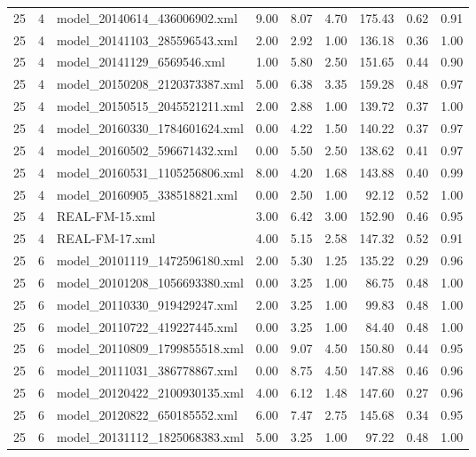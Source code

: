 \begin{table}[ht]
\begin{tabular}{rrlrrrrrr}
   25 &   4 & model\_20140614\_436006902.xml & 9.00 & 8.07 & 4.70 & 175.43 & 0.62 & 0.91 \\ 
   25 &   4 & model\_20141103\_285596543.xml & 2.00 & 2.92 & 1.00 & 136.18 & 0.36 & 1.00 \\ 
   25 &   4 & model\_20141129\_6569546.xml & 1.00 & 5.80 & 2.50 & 151.65 & 0.44 & 0.90 \\ 
   25 &   4 & model\_20150208\_2120373387.xml & 5.00 & 6.38 & 3.35 & 159.28 & 0.48 & 0.97 \\ 
   25 &   4 & model\_20150515\_2045521211.xml & 2.00 & 2.88 & 1.00 & 139.72 & 0.37 & 1.00 \\ 
   25 &   4 & model\_20160330\_1784601624.xml & 0.00 & 4.22 & 1.50 & 140.22 & 0.37 & 0.97 \\ 
   25 &   4 & model\_20160502\_596671432.xml & 0.00 & 5.50 & 2.50 & 138.62 & 0.41 & 0.97 \\ 
   25 &   4 & model\_20160531\_1105256806.xml & 8.00 & 4.20 & 1.68 & 143.88 & 0.40 & 0.99 \\ 
   25 &   4 & model\_20160905\_338518821.xml & 0.00 & 2.50 & 1.00 & 92.12 & 0.52 & 1.00 \\ 
   25 &   4 & REAL-FM-15.xml & 3.00 & 6.42 & 3.00 & 152.90 & 0.46 & 0.95 \\ 
   25 &   4 & REAL-FM-17.xml & 4.00 & 5.15 & 2.58 & 147.32 & 0.52 & 0.91 \\ 
   25 &   6 & model\_20101119\_1472596180.xml & 2.00 & 5.30 & 1.25 & 135.22 & 0.29 & 0.96 \\ 
   25 &   6 & model\_20101208\_1056693380.xml & 0.00 & 3.25 & 1.00 & 86.75 & 0.48 & 1.00 \\ 
   25 &   6 & model\_20110330\_919429247.xml & 2.00 & 3.25 & 1.00 & 99.83 & 0.48 & 1.00 \\ 
   25 &   6 & model\_20110722\_419227445.xml & 0.00 & 3.25 & 1.00 & 84.40 & 0.48 & 1.00 \\ 
   25 &   6 & model\_20110809\_1799855518.xml & 0.00 & 9.07 & 4.50 & 150.80 & 0.44 & 0.95 \\ 
   25 &   6 & model\_20111031\_386778867.xml & 0.00 & 8.75 & 4.50 & 147.88 & 0.46 & 0.96 \\ 
   25 &   6 & model\_20120422\_2100930135.xml & 4.00 & 6.12 & 1.48 & 147.60 & 0.27 & 0.96 \\ 
   25 &   6 & model\_20120822\_650185552.xml & 6.00 & 7.47 & 2.75 & 145.68 & 0.34 & 0.95 \\ 
   25 &   6 & model\_20131112\_1825068383.xml & 5.00 & 3.25 & 1.00 & 97.22 & 0.48 & 1.00 \\ 

\end{tabular}
\end{table}
